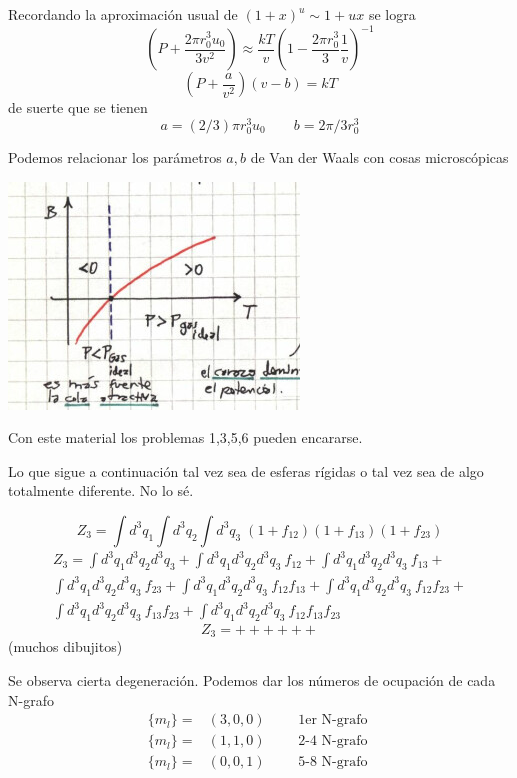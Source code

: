 \documentclass[10pt,oneside]{CBFT_book}
\begin{document}
Recordando la aproximación usual de $ (1+x)^u \sim 1 + u x $ se logra
\[
	\left( P + \frac{2\pi r_0^3 u_0}{3v^2} \right) \approx 
	\frac{kT}{v} \left( 1 - \frac{2\pi r_0^3}{3} \frac{1}{v} \right)^{-1}
\]
\[
	\left( P + \frac{a}{v^2} \right) (v - b) = k T
\]
de suerte que se tienen
\[
	a =(2/3) \pi r_0^3 u_0
	\qquad 
	b = 2 \pi /3 r_0^3
\]

Podemos relacionar los parámetros $a,b$ de Van der Waals con cosas microscópicas

\includegraphics[scale=0.5]{images/1606337115.jpg}

Con este material los problemas 1,3,5,6 pueden encararse.

Lo que sigue a continuación tal vez sea de esferas rígidas o tal vez sea de algo totalmente
diferente. No lo sé.

\[
	Z_3 = \int d^3q_1 \int d^3q_2 \int d^3q_3 \; ( 1 + f_{12} ) ( 1 + f_{13} ) ( 1 + f_{23} )
\]
\begin{multline*}
	Z_3 = 	\int d^3q_1 d^3q_2 d^3q_3 + \int d^3q_1 d^3q_2 d^3q_3 \: f_{12} +
	\int d^3q_1 d^3q_2 d^3q_3 \: f_{13} + \\ \int d^3q_1 d^3q_2 d^3q_3 \: f_{23} +
	\int d^3q_1 d^3q_2 d^3q_3 \: f_{12}f_{13}  + \int d^3q_1 d^3q_2 d^3q_3 \: f_{12}f_{23} + \\
	\int d^3q_1 d^3q_2 d^3q_3 \: f_{13}f_{23} + \int d^3q_1 d^3q_2 d^3q_3 \: f_{12}f_{13}f_{23} 
\end{multline*}
\[
	Z_3 = + + + + + + 
\]
(muchos dibujitos)

Se observa cierta degeneración. Podemos dar los números de ocupación de cada N-grafo
\[
\begin{aligned}
	\{ m_l \} = & (3,0,0) \qquad \text{ 1er N-grafo } \\
	\{ m_l \} = & (1,1,0) \qquad \text{ 2-4 N-grafo } \\
	\{ m_l \} = & (0,0,1) \qquad \text{ 5-8 N-grafo }
\end{aligned}
\]
\end{document}
